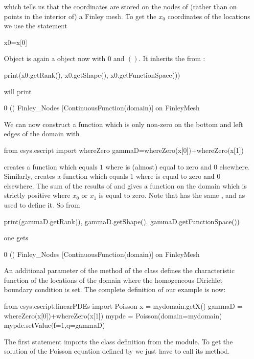 which tells us that the coordinates are stored on the nodes of (rather than on
points in the interior of) a Finley mesh.
To get the  $x_{0}$ coordinates of the locations we use the statement 
\begin{python}
  x0=x[0]
\end{python}
Object  is again a \Data object now with \Rank $0$ and \Shape $()$.
It inherits the \FunctionSpace from :
\begin{python}
  print(x0.getRank(), x0.getShape(), x0.getFunctionSpace())
\end{python}
will print
\begin{python}
  0 () Finley_Nodes [ContinuousFunction(domain)] on FinleyMesh
\end{python}
We can now construct a function  which is only non-zero on the
bottom and left edges of the domain with
\begin{python}
  from esys.escript import whereZero
  gammaD=whereZero(x[0])+whereZero(x[1])
\end{python}

 creates a function which equals $1$ where  is (almost) equal to zero and $0$ elsewhere. 
Similarly,  creates a function which equals $1$ where  is equal to zero and $0$ elsewhere.
The sum of the results of  and 
gives a function on the domain  which is strictly positive where $x_{0}$ or $x_{1}$ is equal to zero.
Note that  has the same \Rank, \Shape and \FunctionSpace as  used to define it.
So from 
\begin{python}
  print(gammaD.getRank(), gammaD.getShape(), gammaD.getFunctionSpace())
\end{python}
one gets 
\begin{python}
  0 () Finley_Nodes [ContinuousFunction(domain)] on FinleyMesh
\end{python}
An additional parameter  of the  method of the \Poisson
class defines the characteristic function of
the locations of the domain where the homogeneous Dirichlet boundary condition is set.
The complete definition of our example is now:
\begin{python}
  from esys.escript.linearPDEs import Poisson
  x = mydomain.getX()
  gammaD = whereZero(x[0])+whereZero(x[1])
  mypde = Poisson(domain=mydomain)
  mypde.setValue(f=1,q=gammaD)
\end{python}
The first statement imports the \Poisson class definition from the \linearPDEs module.
To get the solution of the Poisson equation defined by  we just have to call its  method. 


